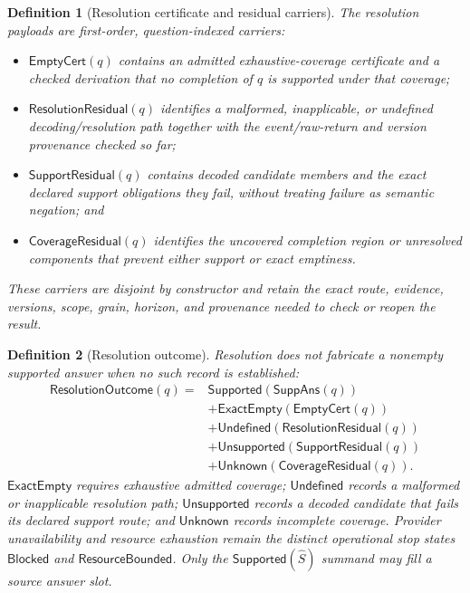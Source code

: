 \documentclass[11pt,oneside]{article}
\newtheorem{definition}{Definition}[section]
\begin{document}
\begin{definition}[Resolution certificate and residual carriers]\label{def:resolution-carriers}
The resolution payloads are first-order, question-indexed carriers:
\begin{itemize}
\item \(\mathsf{EmptyCert}(q)\) contains an admitted exhaustive-coverage certificate and a checked
      derivation that no completion of \(q\) is supported under that coverage;
\item \(\mathsf{ResolutionResidual}(q)\) identifies a malformed, inapplicable, or undefined
      decoding/resolution path together with the event/raw-return and version provenance checked so
      far;
\item \(\mathsf{SupportResidual}(q)\) contains decoded candidate members and the exact declared
      support obligations they fail, without treating failure as semantic negation; and
\item \(\mathsf{CoverageResidual}(q)\) identifies the uncovered completion region or unresolved
      components that prevent either support or exact emptiness.
\end{itemize}
These carriers are disjoint by constructor and retain the exact route, evidence, versions, scope,
grain, horizon, and provenance needed to check or reopen the result.
\end{definition}

\begin{definition}[Resolution outcome]\label{def:resolution-outcome}
Resolution does not fabricate a nonempty supported answer when no such record is established:
\[
\boxed{
\begin{aligned}
\mathsf{ResolutionOutcome}(q)
={}&
\mathsf{Supported}(\mathsf{SuppAns}(q))\\
&+\mathsf{ExactEmpty}(\mathsf{EmptyCert}(q))\\
&+\mathsf{Undefined}(\mathsf{ResolutionResidual}(q))\\
&+\mathsf{Unsupported}(\mathsf{SupportResidual}(q))\\
&+\mathsf{Unknown}(\mathsf{CoverageResidual}(q)).
\end{aligned}
}
\]
\(\mathsf{ExactEmpty}\) requires exhaustive admitted coverage; \(\mathsf{Undefined}\) records a
malformed or inapplicable resolution path; \(\mathsf{Unsupported}\) records a decoded candidate
that fails its declared support route; and \(\mathsf{Unknown}\) records incomplete coverage.
Provider unavailability and resource exhaustion remain the distinct operational stop states
\(\mathsf{Blocked}\) and \(\mathsf{ResourceBounded}\).  Only the
\(\mathsf{Supported}(\widehat S)\) summand may fill a source answer slot.
\end{definition}
\end{document}
